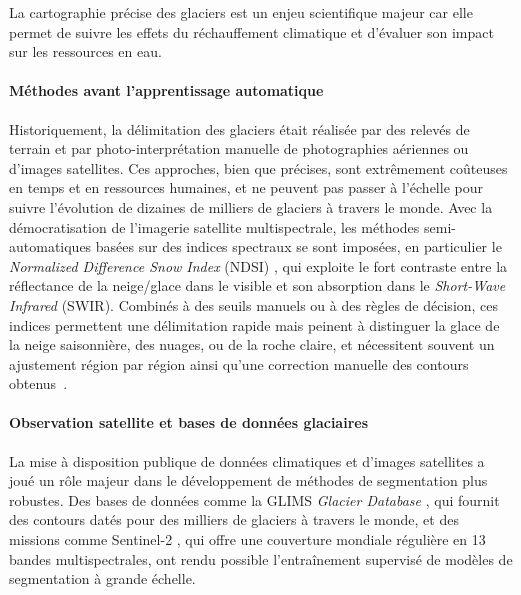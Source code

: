 
La cartographie précise des glaciers est un enjeu scientifique
majeur car elle permet de suivre les effets du réchauffement
climatique et d'évaluer son impact sur les ressources en eau.

\paragraph{Méthodes avant l'apprentissage automatique}
Historiquement, la délimitation des glaciers était réalisée par
des relevés de terrain et par photo-interprétation manuelle de
photographies aériennes ou d'images satellites. Ces approches,
bien que précises, sont extrêmement coûteuses en temps et en
ressources humaines, et ne peuvent pas passer à l'échelle pour
suivre l'évolution de dizaines de milliers de glaciers à travers
le monde. Avec la démocratisation de l'imagerie satellite
multispectrale, les méthodes semi-automatiques basées sur des
indices spectraux se sont imposées, en particulier le
\emph{Normalized Difference Snow Index} (NDSI) \citep{hall1995ndsi},
qui exploite le fort contraste entre la réflectance de la
neige/glace dans le visible et son absorption dans le \emph{Short-Wave Infrared} (SWIR).
Combinés à des seuils manuels ou à des règles de décision, ces
indices permettent une délimitation rapide mais peinent à
distinguer la glace de la neige saisonnière, des nuages, ou de
la roche claire, et nécessitent souvent un ajustement région
par région ainsi qu'une correction manuelle des contours obtenus~\citep{paul2002glaciermapping,
racoviteanu2009glacier}.

\paragraph{Observation satellite et bases de données glaciaires}
La mise à disposition publique de données climatiques et d'images
satellites a joué un rôle majeur dans le développement de méthodes
de segmentation plus robustes. Des bases de données comme la
GLIMS \emph{Glacier Database} \citep{raup2007glims}, qui fournit
des contours datés pour des milliers de glaciers à travers le
monde, et des missions comme Sentinel-2 \citep{drusch2012sentinel},
qui offre une couverture mondiale régulière en 13 bandes
multispectrales, ont rendu possible l'entraînement supervisé de
modèles de segmentation à grande échelle.

